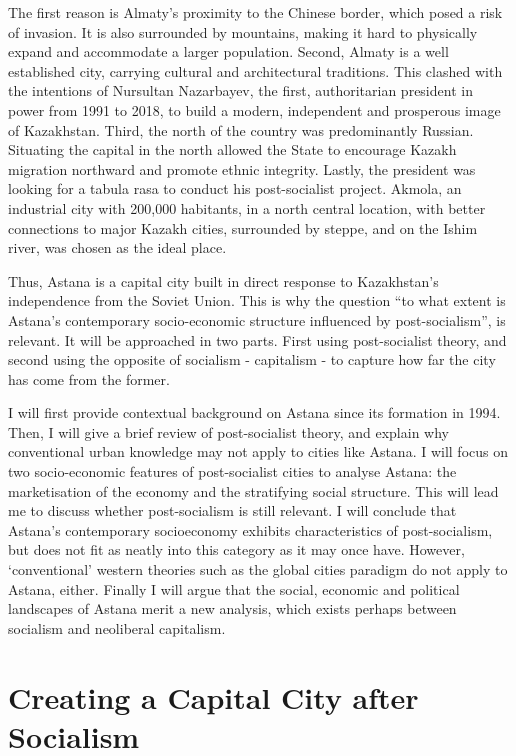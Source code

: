 \documentclass{article}
\begin{document}
The first reason is Almaty's proximity to the Chinese border, which posed a risk of invasion. It is also surrounded by mountains, making it hard to physically expand and accommodate a larger population. 
Second, Almaty is a well established city, carrying cultural and architectural traditions. This clashed with the intentions of Nursultan Nazarbayev, the first, authoritarian president in power from 1991 to 2018, to build a modern, independent and prosperous image of Kazakhstan. 
Third, the north of the country was predominantly Russian. Situating the capital in the north allowed the State to encourage Kazakh migration northward and promote ethnic integrity.
 Lastly, the president was looking for a tabula rasa to conduct his post-socialist project. Akmola, an industrial city with 200,000 habitants, in a north central location, with better connections to major Kazakh cities, surrounded by steppe, and on the Ishim river, was chosen as the ideal place.

Thus, Astana is a capital city built in direct response to Kazakhstan's independence from the Soviet Union. This is why the question “to what extent is Astana's contemporary socio-economic structure influenced by post-socialism”, is relevant. It will be approached in two parts. First using post-socialist theory, and second using the opposite of socialism - capitalism - to capture how far the city has come from the former.

I will first provide contextual background on Astana since its formation in 1994. Then, I will give a brief review of post-socialist theory, and explain why conventional urban knowledge may not apply to cities like Astana. 
I will focus on two socio-economic features of post-socialist cities to analyse Astana: the marketisation of the economy and the stratifying social structure.
This will lead me to discuss whether post-socialism is still relevant. I will conclude that Astana's contemporary socioeconomy exhibits characteristics of post-socialism, but does not fit as neatly into this category as it may once have. 
However, `conventional' western theories such as the global cities paradigm do not apply to Astana, either. 
Finally I will argue that the social, economic and political landscapes of Astana merit a new analysis, which exists perhaps between socialism and neoliberal capitalism.

\section{Creating a Capital City after Socialism}
\end{document}

